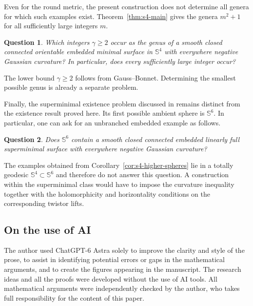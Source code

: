 \documentclass[a4paper,11pt,oneside,reqno]{amsart}
\numberwithin{equation}{section}
\newtheorem*{question}{Question}
\theoremstyle{definition}
\renewcommand\labelitemi{$\vcenter{\hbox{\tiny$\bullet$}}$}
\begin{document}
Even for the round metric, the present construction does
not determine all genera for which such examples exist.
Theorem~\ref{thm:s4-main} gives the genera $m^2+1$ for
all sufficiently large integers $m$.

\begin{question}
    \label{que:s4-prescribed-genus}
    Which integers $\gamma\geq2$ occur as the genus of
    a smooth closed connected orientable embedded minimal
    surface in $\mathbb{S}^4$ with everywhere negative
    Gaussian curvature? In particular, does every
    sufficiently large integer occur?
\end{question}
%
The lower bound $\gamma\geq2$ follows from Gauss--Bonnet. Determining the smallest possible genus is already a
separate problem.

Finally, the superminimal existence problem discussed
in \cite[Conjecture~1.3]{CaniatoHighDimensionalFamilies}
remains distinct from the existence result proved here.
Its first possible ambient sphere is $\mathbb{S}^6$.
In particular, one can ask for an unbranched embedded
example as follows.

\begin{question}
    \label{que:s4-superminimal-six-sphere}
    Does $\mathbb{S}^6$ contain a smooth closed connected
    embedded linearly full superminimal surface with
    everywhere negative Gaussian curvature?
\end{question}
%
The examples obtained from
Corollary~\ref{cor:s4-higher-spheres} lie in a totally
geodesic $\mathbb{S}^4\subset\mathbb{S}^6$ and therefore
do not answer this question. A construction within the
superminimal class would have to impose the curvature
inequality together with the holomorphicity and
horizontality conditions on the corresponding twistor
lifts.
\renewcommand\labelitemi{$\vcenter{\hbox{\tiny$\bullet$}}$}
\begingroup
\renewcommand{\addcontentsline}[3]{}
\subsection*{On the use of AI}
The author used ChatGPT-6 Astra solely to improve the clarity and style of the prose, to assist in identifying potential errors or gaps in the mathematical arguments, and to create the figures appearing in the manuscript. The research ideas and all the proofs were developed without the use of AI tools. All mathematical arguments were independently checked by the author, who takes full responsibility for the content of this paper.
\par
\endgroup
%
\renewcommand\labelitemi{$\vcenter{\hbox{\tiny$\bullet$}}$}
\begingroup
\renewcommand{\addcontentsline}[3]{}
\end{document}
